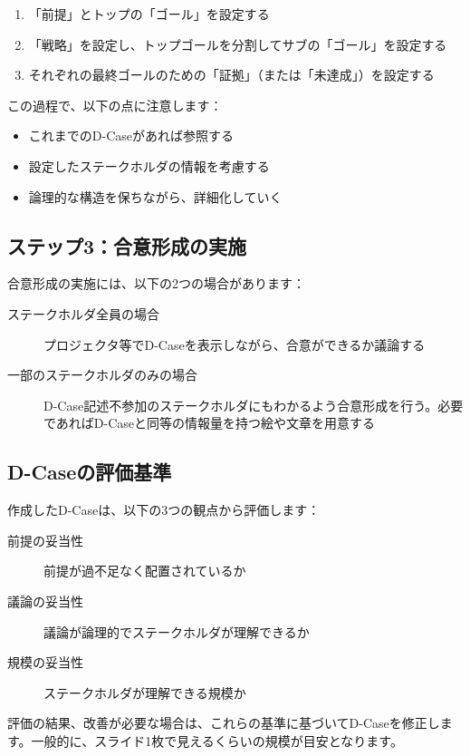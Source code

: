 \begin{enumerate}
    \item 「前提」とトップの「ゴール」を設定する
    \item 「戦略」を設定し、トップゴールを分割してサブの「ゴール」を設定する
    \item それぞれの最終ゴールのための「証拠」（または「未達成」）を設定する
\end{enumerate}

この過程で、以下の点に注意します：

\begin{itemize}
    \item これまでのD-Caseがあれば参照する
    \item 設定したステークホルダの情報を考慮する
    \item 論理的な構造を保ちながら、詳細化していく
\end{itemize}

\subsection{ステップ3：合意形成の実施}

合意形成の実施には、以下の2つの場合があります：

\begin{description}
    \item[ステークホルダ全員の場合] プロジェクタ等でD-Caseを表示しながら、合意ができるか議論する
    \item[一部のステークホルダのみの場合] D-Case記述不参加のステークホルダにもわかるよう合意形成を行う。必要であればD-Caseと同等の情報量を持つ絵や文章を用意する
\end{description}

\subsection{D-Caseの評価基準}

作成したD-Caseは、以下の3つの観点から評価します：

\begin{description}
    \item[前提の妥当性] 前提が過不足なく配置されているか
    \item[議論の妥当性] 議論が論理的でステークホルダが理解できるか
    \item[規模の妥当性] ステークホルダが理解できる規模か
\end{description}

評価の結果、改善が必要な場合は、これらの基準に基づいてD-Caseを修正します。一般的に、スライド1枚で見えるくらいの規模が目安となります。

